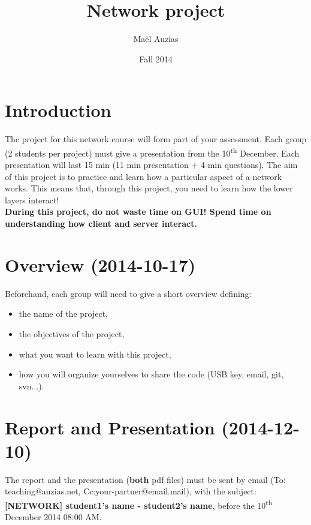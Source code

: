 \documentclass[11pt]{article}
\begin{document}
 
\title{Network project}
\date{Fall 2014}
\author{Maël Auzias}
\maketitle

\section{Introduction}
The project for this network course will form part of your assessment. Each group (2 students per project) must give a presentation from the 10\textsuperscript{th} December. Each presentation will last 15 min (11 min presentation + 4 min questions). The aim of this project is to practice and learn how a particular aspect of a network works. This means that, through this project, you need to learn how the lower layers interact!\\
\textbf{During this project, do not waste time on GUI! Spend time on understanding how client and server interact.}

\section{Overview (2014-10-17)}
Beforehand, each group will need to give a short overview defining:
  \begin{itemize}
    \item the name of the project,
    \item the objectives of the project,
    \item what you want to learn with this project,
    \item how you will organize yourselves to share the code (USB key, email, git, svn...).
  \end{itemize}

\section{Report and Presentation (2014-12-10)}
The report and the presentation (\textbf{both} pdf files) must be sent by email (To: teaching@auzias.net, Cc:your-partner@email.mail), with the subject: \textbf{[NETWORK] student1's name - student2's name}, before the 10\textsuperscript{th} December 2014 08:00 AM.
\end{document}
